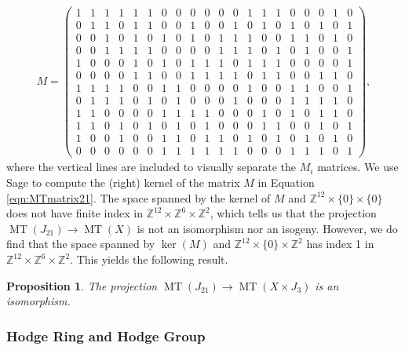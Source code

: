 \documentclass[reqno, oneside, 12pt]{amsart}
\DeclareMathOperator{\MT}{MT}
\newcommand{\Z}{\mathbb{Z}}
\newtheorem{proposition}[theorem]{Proposition}
\theoremstyle{remark}
\numberwithin{equation}{section}
\begin{document}
\begin{align}\label{eqn:MTmatrix21}
M=\left(\begin{array}{rrrrrrrrrrrr|rrrrrr|rr}
1 & 1 & 1 & 1 & 1 & 1 & 0 & 0 & 0 & 0 & 0 & 0 & 1 & 1 & 1 & 0 & 0 & 0 & 1 & 0 \\
0 & 1 & 1 & 0 & 1 & 1 & 0 & 0 & 1 & 0 & 0 & 1 & 0 & 1 & 0 & 1 & 0 & 1 & 0 & 1 \\
0 & 0 & 1 & 0 & 1 & 0 & 1 & 0 & 1 & 0 & 1 & 1 & 1 & 0 & 0 & 1 & 1 & 0 & 1 & 0 \\
0 & 0 & 1 & 1 & 1 & 1 & 0 & 0 & 0 & 0 & 1 & 1 & 1 & 0 & 1 & 0 & 1 & 0 & 0 & 1 \\
1 & 0 & 0 & 0 & 1 & 0 & 1 & 0 & 1 & 1 & 1 & 0 & 1 & 1 & 1 & 0 & 0 & 0 & 0 & 1 \\
0 & 0 & 0 & 0 & 1 & 1 & 0 & 0 & 1 & 1 & 1 & 1 & 0 & 1 & 1 & 0 & 0 & 1 & 1 & 0 \\
1 & 1 & 1 & 1 & 0 & 0 & 1 & 1 & 0 & 0 & 0 & 0 & 1 & 0 & 0 & 1 & 1 & 0 & 0 & 1 \\
0 & 1 & 1 & 1 & 0 & 1 & 0 & 1 & 0 & 0 & 0 & 1 & 0 & 0 & 0 & 1 & 1 & 1 & 1 & 0 \\
1 & 1 & 0 & 0 & 0 & 0 & 1 & 1 & 1 & 1 & 0 & 0 & 0 & 1 & 0 & 1 & 0 & 1 & 1 & 0 \\
1 & 1 & 0 & 1 & 0 & 1 & 0 & 1 & 0 & 1 & 0 & 0 & 0 & 1 & 1 & 0 & 0 & 1 & 0 & 1 \\
1 & 0 & 0 & 1 & 0 & 0 & 1 & 1 & 0 & 1 & 1 & 0 & 1 & 0 & 1 & 0 & 1 & 0 & 1 & 0 \\
0 & 0 & 0 & 0 & 0 & 0 & 1 & 1 & 1 & 1 & 1 & 1 & 0 & 0 & 0 & 1 & 1 & 1 & 0 & 1
\end{array}\right),
\end{align}
where the vertical lines are included to visually separate the $M_i$ matrices. We use Sage to  compute the (right) kernel of the matrix $M$ in Equation \ref{eqn:MTmatrix21}. The space spanned by the kernel of $M$ and $\Z^{12}\times \{0\}\times \{0\}$ does not have finite index in $\Z^{12}\times\Z^6\times \Z^2$, which tells us that the projection $\MT(J_{21})\to \MT(X)$ is not an isomorphism nor an isogeny. However, we do find that the space spanned by $\ker(M)$ and $\Z^{12}\times \{0\}\times \Z^{2}$  has index 1 in $\Z^{12}\times\Z^6\times \Z^2$. This yields the following result.
\begin{proposition}
The projection $\MT(J_{21})\to \MT(X\times J_3)$ is an isomorphism.
\end{proposition}




\subsubsection{Hodge Ring and Hodge Group}
\end{document}
